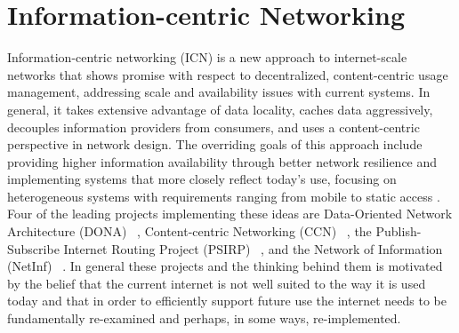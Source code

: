 \section{Information-centric Networking}
\label{section:information-centric-networking}
Information-centric networking (ICN) is a new approach to internet-scale networks that shows promise with respect to decentralized, content-centric usage management, addressing scale and availability issues with current systems.  In general, it takes extensive advantage of data locality, caches data aggressively, decouples information providers from consumers, and uses a content-centric perspective in network design. The overriding goals of this approach include providing higher information availability through better network resilience and implementing systems that more closely reflect today's use, focusing on heterogeneous systems with requirements ranging from mobile to static access \cite{6231276}.  Four of the leading projects implementing these ideas are Data-Oriented Network Architecture (DONA) ~\cite{Koponen:2007:DNA:1282427.1282402}, Content-centric Networking (CCN) ~\cite{NDN,CCNx}, the Publish-Subscribe Internet Routing Project (PSIRP) ~\cite{PSIRP}, and the Network of Information (NetInf) ~\cite{NetInf}.  In general these projects and the thinking behind them is motivated by the belief that the current internet is not well suited to the way it is used today and that in order to efficiently support future use the internet needs to be fundamentally re-examined and perhaps, in some ways, re-implemented.

